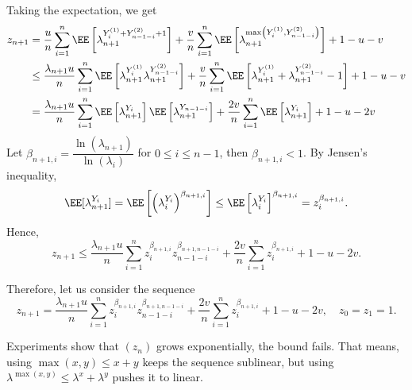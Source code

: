 Taking the expectation, we get
\begin{align*}
  z_{n+1}
   & = \dfrac{u}{n}\sum\limits_{i=1}^n \EE\left[\lambda_{n+1}^{Y_{i}^{(1)} + Y_{n-1-i}^{(2)} + 1}\right] + \dfrac{v}{n}\sum\limits_{i=1}^n \EE\left[\lambda_{n+1}^{\max\left(Y_{i}^{(1)}, Y_{n-1-i}^{(2)}\right)}\right] + 1-u-v                           \\
   & \le \dfrac{\lambda_{n+1}u}{n}\sum\limits_{i=1}^n \EE\left[\lambda_{n+1}^{Y_{i}^{(1)}}\lambda_{n+1}^{Y_{n-1-i}^{(2)}}\right] + \dfrac{v}{n}\sum\limits_{i=1}^n \EE\left[\lambda_{n+1}^{Y_{i}^{(1)}} + \lambda_{n+1}^{Y_{n-1-i}^{(2)}}-1\right] + 1-u-v \\
   & = \dfrac{\lambda_{n+1}u}{n}\sum\limits_{i=1}^n \EE\left[\lambda_{n+1}^{Y_{i}}\right]\EE\left[\lambda_{n+1}^{Y_{n-1-i}}\right] + \dfrac{2v}{n}\sum\limits_{i=1}^n \EE\left[\lambda_{n+1}^{Y_{i}} \right] + 1-u-2v                                      \\
\end{align*}
Let $\beta_{n+1,i}=\dfrac{\ln(\lambda_{n+1})}{\ln(\lambda_{i})}$ for $0\le i \le n-1$, then $\beta_{n+1,i}<1$. By Jensen's inequality,
$$\EE[\lambda_{n+1}^{Y_{i}}]=\EE\left[\left(\lambda_{i}^{Y_{i}}\right)^{\beta_{n+1,i}}\right]\le \EE\left[\lambda_{i}^{Y_{i}}\right]^{\beta_{n+1,i}} = z_i^{\beta_{n+1,i}}.$$
Hence,
$$z_{n+1} \le \dfrac{\lambda_{n+1}u}{n}\sum\limits_{i=1}^n z_i^{\beta_{n+1,i}}z_{n-1-i}^{\beta_{n+1,n-1-i}} + \dfrac{2v}{n}\sum\limits_{i=1}^n z_i^{\beta_{n+1,i}} + 1-u-2v.$$



Therefore, let us consider the sequence
\begin{equation}
  \label{eq:upper_bound_z}
  z_{n+1} = \dfrac{\lambda_{n+1}u}{n}\sum\limits_{i=1}^n z_i^{\beta_{n+1,i}}z_{n-1-i}^{\beta_{n+1,n-1-i}} + \dfrac{2v}{n}\sum\limits_{i=1}^n z_i^{\beta_{n+1,i}} + 1-u-2v, \quad z_0=z_1=1.
\end{equation}

Experiments show that $(z_n)$ grows exponentially, the bound fails. That means, using $\max(x,y) \le x+y$ keeps the sequence sublinear, but using $\lambda^{\max(x,y)} \le \lambda^x + \lambda^y$ pushes it to linear.


